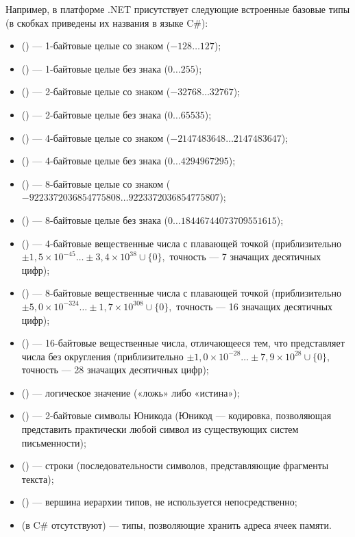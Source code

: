 Например, в платформе .NET присутствует следующие встроенные базовые
типы (в скобках приведены их названия в языке C\#):
\begin{itemize}
\item {} () — 1-байтовые целые со знаком
  ($-128\ldots127$);
\item {} () — 1-байтовые целые без знака
  ($0\ldots255$);
\item {} () — 2-байтовые целые со знаком
  ($-32768\ldots32767$);
\item {} () — 2-байтовые целые без знака
  ($0\ldots65535$);
\item {} () — 4-байтовые целые со знаком
  ($-2147483648\ldots2147483647$);
\item {} () — 4-байтовые целые без знака
  ($0\ldots4294967295$);
\item {} () — 8-байтовые целые со знаком
  ($-9223372036854775808\ldots9223372036854775807$);
\item {} () — 8-байтовые целые без знака
  ($0\ldots18446744073709551615$);
\item {} () — 4-байтовые вещественные числа с
  плавающей точкой (приблизительно
  $\pm1{,}5\times10^{-45}\ldots\pm3{,}4\times10^{38}\cup\{0\},$
  точность — 7 значащих десятичных цифр);
\item {} () — 8-байтовые вещественные числа с
  плавающей точкой (приблизительно
  $\pm5{,}0\times10^{-324}\ldots\pm1{,}7\times10^{308}\cup\{0\},$
  точность — 16 значащих десятичных цифр);
\item {} () — 16-байтовые вещественные
  числа, отличающееся тем, что представляет числа без округления
  (приблизительно
  $\pm1{,}0\times10^{-28}\ldots\pm7{,}9\times10^{28}\cup\{0\},$
  точность — 28 значащих десятичных цифр);
\item {} () — логическое значение («ложь» либо
  «истина»);
\item {} () — 2-байтовые символы Юникода (Юникод
  — кодировка, позволяющая представить практически любой символ из
  существующих систем письменности);
\item {} () — строки (последовательности
  символов, представляющие фрагменты текста);
\item {} () — вершина иерархии типов, не
  используется непосредственно;
\item {} (в C\# отсутствуют) — типы, позволяющие
  хранить адреса ячеек памяти.
\end{itemize}

